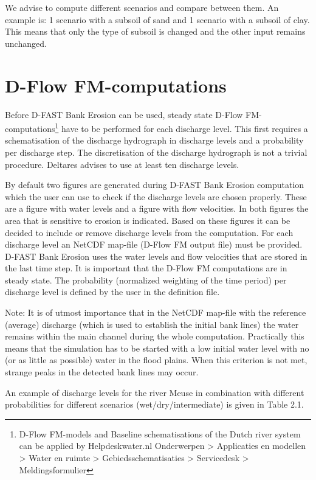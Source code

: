 We advise to compute different scenarios and compare between them.
An example is: 1 scenario with a subsoil of sand and 1 scenario with a subsoil of clay.
This means that only the type of subsoil is changed and the other input remains unchanged.

\section{D-Flow FM-computations}

Before D-FAST Bank Erosion can be used, steady state D-Flow FM-computations\footnote{D-Flow FM-models and Baseline schematisations of the Dutch river system can be applied by Helpdeskwater.nl Onderwerpen > Applicaties en modellen > Water en ruimte > Gebiedsschematisaties > Servicedesk > Meldingsformulier} have to be performed for each discharge level.
This first requires a schematisation of the discharge hydrograph in discharge levels and a probability per discharge step.
The discretisation of the discharge hydrograph is not a trivial procedure.
Deltares advises to use at least ten discharge levels.

By default two figures are generated during D-FAST Bank Erosion computation which the user can use to check if the discharge levels are chosen properly.
These are a figure with water levels and a figure with flow velocities.
In both figures the area that is sensitive to erosion is indicated.
Based on these figures it can be decided to include or remove discharge levels from the computation.
For each discharge level an NetCDF map-file (D-Flow FM output file) must be provided.
D-FAST Bank Erosion uses the water levels and flow velocities that are stored in the last time step.
It is important that the D-Flow FM computations are in steady state.
The probability (normalized weighting of the time period) per discharge level is defined by the user in the definition file.

Note: It is of utmost importance that in the NetCDF map-file with the reference (average) discharge (which is used to establish the initial bank lines) the water remains within the main channel during the whole computation.
Practically this means that the simulation has to be started with a low initial water level with no (or as little as possible) water in the flood plains.
When this criterion is not met, strange peaks in the detected bank lines may occur.



An example of discharge levels for the river Meuse in combination with different probabilities for different scenarios (wet/dry/intermediate) is given in Table 2.1.

